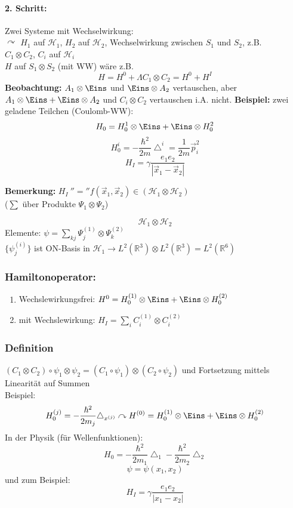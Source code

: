 \documentclass[twoside,a4paper]{scrartcl}
\renewcommand{\1}{\mathds{1}}
\newcommand{\ra}{\rightarrow}
\begin{document}
\paragraph{2. Schritt:} Zwei Systeme mit Wechselwirkung:\\
$\curvearrowright$ $H_1$ auf $\mathcal H_1$, $H_2$ auf $\mathcal H_2$, Wechselwirkung zwischen $S_1$ und $S_2$, z.B. \\
$C_1 \otimes C_2$, $C_i$ auf $\mathcal H_i$\\
$H$ auf $S_1 \otimes S_2$ (mit WW) wäre z.B. 
$$H=H^0+ \Lambda C_1 \otimes C_2=H^0+H^I$$
\textbf{Beobachtung:}
$A_1\otimes \Eins$ und $\Eins \otimes A_2$ vertauschen, aber $A_1 \otimes \Eins + \Eins \otimes A_2$ und $C_i \otimes C_2$ vertauschen i.A. nicht.
\textbf{Beispiel:} zwei geladene Teilchen (Coulomb-WW):\\
$$H_0=H_0^1\otimes \Eins +\Eins \otimes H_0^2$$
$$H_0^i=-\frac{\hbar^2}{2m}\bigtriangleup^i=\frac{1}{2m}\vec p^2_i$$
$$H_I=\gamma \frac{e_1 e_2}{|\vec x_1-\vec x_2|}$$

\textbf{Bemerkung:} $H_I \ ''='' f(\vec x_1, \vec x_2) \in (\mathcal H_1 \otimes \mathcal H_2)$\\
($\sum$ über Produkte $\Psi_1 \otimes \Psi_2$)


$$\mathcal H_1 \otimes \mathcal H_2$$
Elemente: $\psi=\sum_{kj} \Psi_j^{(1)}\otimes \Psi_k^{(2)}$\\
$\{\psi_j^{(i)} \}$ ist ON-Basis in $\mathcal H_1 \ra L^2(\mathbb R^3) \otimes L^2(\mathbb R^3) =L^2(\mathbb R^6)$
\subsubsection*{Hamiltonoperator:}
\begin{enumerate}
 \item Wechslewirkungsfrei: $H^0=H_0^{(1)}\otimes \Eins+\Eins\otimes H_0^{(2)}$
 \item mit Wechslewirkung: $H_I=\sum_i C_i^{(1)}\otimes C_i^{(2)}$
\end{enumerate}
\subsubsection*{Definition}
$(C_1\otimes C_2 ) \circ \psi_1 \otimes \psi_2=(C_1 \circ \psi_1) \otimes (C_2 \circ \psi_2)$ und Fortsetzung mittels Linearität auf Summen\\
Beispiel:
$$H_0^{(j)}=-\frac{\hbar^2}{2m_j} \bigtriangleup_{x^{(j)}} \curvearrowright H^{(0)}=H_0^{(1)}\otimes \Eins+\Eins\otimes H_0^{(2)}$$
In der Physik (für Wellenfunktionen):
$$H_0=-\frac{\hbar^2}{2m_1} \bigtriangleup_{1}-\frac{\hbar^2}{2m_2} \bigtriangleup_{2} $$
$$\psi=\psi(x_1,x_2)$$
und zum Beispiel:
$$H_I=\gamma \frac{e_1e_2}{|x_1-x_2|}$$
\end{document}
